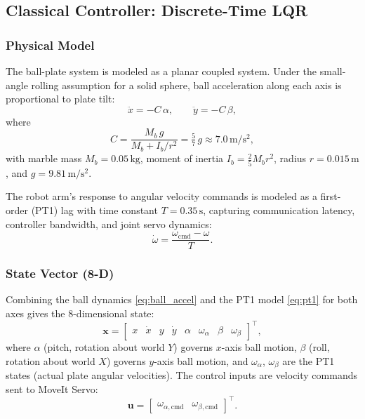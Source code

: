 \documentclass[journal]{IEEEtran}
\begin{document}
\subsection{Classical Controller: Discrete-Time LQR}

\subsubsection{Physical Model}
The ball-plate system is modeled as a planar coupled system. Under the small-angle rolling assumption for a
solid sphere, ball acceleration along each axis is proportional to plate tilt:
%
\begin{equation}
  \ddot{x} = -C\,\alpha, \qquad \ddot{y} = -C\,\beta,
  \label{eq:ball_accel}
\end{equation}
%
where
%
\begin{equation}
  C = \frac{M_b\,g}{M_b + I_b/r^2} = \tfrac{5}{7}\,g \approx 7.0\,\mathrm{m/s^2},
\end{equation}
%
with marble mass $M_b = 0.05\,\mathrm{kg}$, moment of inertia $I_b = \tfrac{2}{5}M_b r^2$,
radius $r = 0.015\,\mathrm{m}$, and $g = 9.81\,\mathrm{m/s^2}$.

The robot arm's response to angular velocity commands is modeled as a first-order (PT1) lag with time
constant $T = 0.35\,\mathrm{s}$, capturing communication latency, controller bandwidth, and joint servo
dynamics:
%
\begin{equation}
  \dot{\omega} = \frac{\omega_\mathrm{cmd} - \omega}{T}.
  \label{eq:pt1}
\end{equation}

\subsubsection{State Vector (8-D)}
Combining the ball dynamics \eqref{eq:ball_accel} and the PT1 model \eqref{eq:pt1} for both axes gives the
8-dimensional state:
%
\begin{equation}
  \mathbf{x} = \begin{bmatrix}
    x & \dot{x} & y & \dot{y} & \alpha & \omega_\alpha & \beta & \omega_\beta
  \end{bmatrix}^\top,
  \label{eq:state}
\end{equation}
%
where $\alpha$ (pitch, rotation about world $Y$) governs $x$-axis ball motion, $\beta$ (roll, rotation
about world $X$) governs $y$-axis ball motion, and $\omega_\alpha$, $\omega_\beta$ are the PT1 states
(actual plate angular velocities). The control inputs are velocity commands sent to MoveIt Servo:
%
\begin{equation}
  \mathbf{u} = \begin{bmatrix} \omega_{\alpha,\mathrm{cmd}} & \omega_{\beta,\mathrm{cmd}} \end{bmatrix}^\top.
\end{equation}
\end{document}
